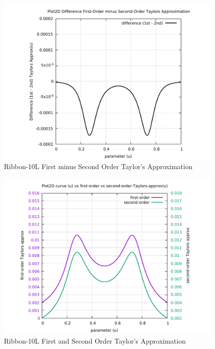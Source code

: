 \begin{figure}
	\caption     {Ribbon-10L First minus Second Order Taylor's Approximation}
	\label{06-img-Ribbon-10L-First-minus-Second-Order-Taylors-Approx.pdf}
	\includegraphics[width=1.00\textwidth]{Chap4/appendix/app-Ribbon-10L/plots/06-img-Ribbon-10L-First-minus-Second-Order-Taylors-Approx.pdf}
\end{figure}

\clearpage
\pagebreak

\begin{figure}
	\caption     {Ribbon-10L First and Second Order Taylor's Approximation}
	\label{07-img-Ribbon-10L-First-and-Second-Order-Taylors-Approx.pdf}
	\includegraphics[width=1.00\textwidth]{Chap4/appendix/app-Ribbon-10L/plots/07-img-Ribbon-10L-First-and-Second-Order-Taylors-Approx.pdf}
\end{figure}


